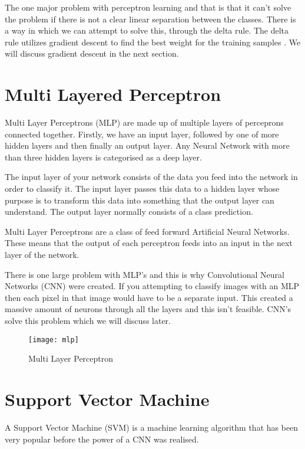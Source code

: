 The one major problem with perceptron learning and that is that it can't solve
the problem if there is not a clear linear separation between the classes. There
is a way in which we can attempt to solve this, through the delta rule. The
delta rule utilizes gradient descent to find the best weight for the training
samples \textcite{MLANN}. We will discuss gradient descent in the next section.

\section{Multi Layered Perceptron}
Multi Layer Perceptrons (MLP) are made up of multiple layers of perceprons connected
together.
Firstly, we have an input layer, followed by one of more hidden layers and then
finally an output layer.
Any Neural Network with more than three hidden layers is categorised as a deep
layer.

The input layer of your network consists of the data you feed into the network
in order to classify it. The input layer passes this data to a hidden layer
whose purpose is to transform this data into something that the output layer can
understand. The output layer normally consists of a class prediction.

Multi Layer Perceptrons are a class of feed forward Artificial Neural Networks.
These means that the output of each perceptron feeds into an input in the next
layer of the network.

There is one large problem with MLP's and this is why Convolutional Neural
Networks (CNN) were created. If you attempting to classify images with an MLP then
each pixel in that image would have to be a separate input. This created a
massive amount of neurons through all the layers and this isn't feasible. CNN's
solve this problem which we will discuss later.

\begin{figure}
    \texttt{[image: mlp]}
     \caption{Multi Layer Perceptron}
     \label{fig:mlp}
\end{figure}



\section{Support Vector Machine}
A Support Vector Machine (SVM) is a machine learning algorithm that has been
very popular before the power of a CNN was realised.

